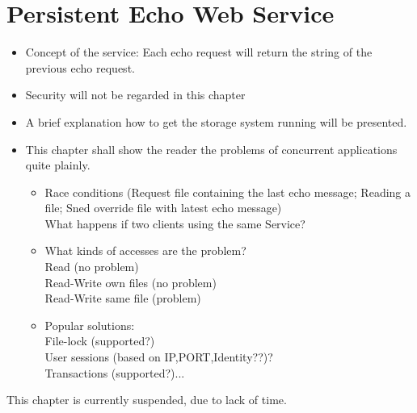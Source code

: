 \chapter{Persistent Echo Web Service}


\begin{itemize}
 \item Concept of the service: Each echo request will return the string of the previous echo request.
 \item Security will not be regarded in this chapter
 \item A brief explanation how to get the storage system running will be presented.
 \item This chapter shall show the reader the problems of concurrent applications quite plainly.
 \begin{itemize}
 	\item Race conditions (Request file containing the last echo message; Reading a file; Sned override file with latest echo message)\\
	What happens if two clients using the same Service?
	\item What kinds of accesses are the problem?\\
        Read (no problem)\\
        Read-Write own files (no problem)\\
        Read-Write same file (problem)
	\item Popular solutions:\\
          File-lock (supported?)\\ 
          User sessions (based on IP,PORT,Identity??)?\\ 
          Transactions (supported?)...
\end{itemize}
\end{itemize}
\forcelinebreak
\forcelinebreak
\textcolor{urgent}{This chapter is currently suspended, due to lack of time.}





